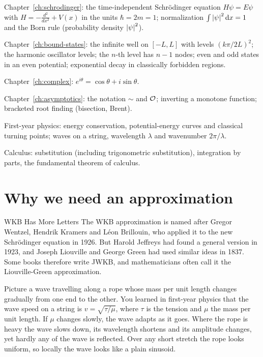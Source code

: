 \begin{prerequisites}
\item Chapter~\ref{ch:schrodinger}: the time-independent Schr\"odinger equation $H\psi=E\psi$ with $H=-\frac{d^2}{dx^2}+V(x)$ in the units $\hbar=2m=1$; normalization $\int\left\lvert \psi\right\rvert^2\mathrm{d} x=1$ and the Born rule (probability density $\left\lvert \psi\right\rvert^2$).
\item Chapter~\ref{ch:bound-states}: the infinite well on $[-L,L]$ with levels $(k\pi/2L)^2$; the harmonic oscillator levels; the $n$-th level has $n-1$ nodes; even and odd states in an even potential; exponential decay in classically forbidden regions.
\item Chapter~\ref{ch:complex}: $e^{i\theta}=\cos\theta+i\sin\theta$.
\item Chapter~\ref{ch:asymptotics}: the notation $\sim$ and $\mathcal{O}$; inverting a monotone function; bracketed root finding (bisection, Brent).
\item First-year physics: energy conservation, potential-energy curves and classical turning points; waves on a string, wavelength $\lambda$ and wavenumber $2\pi/\lambda$.
\item Calculus: substitution (including trigonometric substitution), integration by parts, the fundamental theorem of calculus.
\end{prerequisites}

\section{Why we need an approximation}\label{sec:wkb-why}
\begin{didyouknow}{WKB Has More Letters}
The WKB approximation is named after Gregor Wentzel, Hendrik Kramers and L\'eon Brillouin, who applied it to the new Schr\"odinger equation in 1926. But Harold Jeffreys had found a general version in 1923, and Joseph Liouville and George Green had used similar ideas in 1837. Some books therefore write JWKB, and mathematicians often call it the Liouville-Green approximation.
\end{didyouknow}

Picture a wave travelling along a rope whose mass per unit length changes gradually from one end to the other. You learned in first-year physics that the wave speed on a string is $v=\sqrt{\tau/\mu}$, where $\tau$ is the tension and $\mu$ the mass per unit length. If $\mu$ changes slowly, the wave adapts as it goes. Where the rope is heavy the wave slows down, its wavelength shortens and its amplitude changes, yet hardly any of the wave is reflected. Over any short stretch the rope looks uniform, so locally the wave looks like a plain sinusoid.

